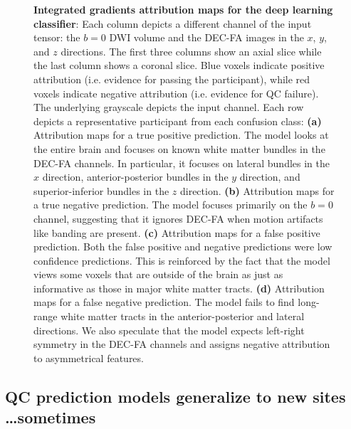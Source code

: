 \documentclass[9pt,lineno]{elife}
\begin{document}
\begin{figure}[tbp]
\begin{fullwidth}
\begin{subfigure}{\dimexpr\linewidth-3.5em\relax}
    \end{subfigure}
    \caption{%
        {\bf Integrated gradients attribution maps for the deep learning classifier}:
        Each column depicts a different channel of the input tensor: the $b=0$
        DWI volume and the DEC-FA images in the $x$, $y$, and $z$ directions.
        The first three columns show an axial slice while the last column
        shows a coronal slice. Blue voxels indicate positive attribution (i.e.
        evidence for passing the participant), while red voxels indicate negative
        attribution (i.e. evidence for QC failure). The underlying grayscale
        depicts the input channel. Each row depicts a representative participant
        from each confusion class:
        \textbf{(a)} Attribution maps for a true positive prediction. The model
        looks at the entire brain and focuses on known white matter bundles in
        the DEC-FA channels. In particular, it focuses on lateral bundles in the
        $x$ direction, anterior-posterior bundles in the $y$ direction, and
        superior-inferior bundles in the $z$ direction.
        \textbf{(b)} Attribution maps for a true negative prediction. The model
        focuses primarily on the $b=0$ channel, suggesting that it ignores
        DEC-FA when motion artifacts like banding are present.
        \textbf{(c)} Attribution maps for a false positive prediction. Both the
        false positive and negative predictions were low confidence predictions.
        This is reinforced by the fact that the model views some voxels that are
        outside of the brain as just as informative as those in major white
        matter tracts.
        \textbf{(d)} Attribution maps for a false negative prediction. The model
        fails to find long-range white matter tracts in the anterior-posterior
        and lateral directions. We also speculate that the model expects
        left-right symmetry in the DEC-FA channels and assigns negative
        attribution to asymmetrical features. }
    \label{fig:ig}
\end{fullwidth}
\end{figure}

\subsection{QC prediction models generalize to new sites \ldots sometimes}

\end{document}

